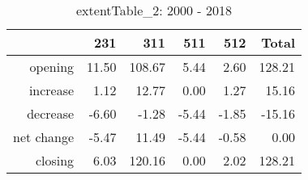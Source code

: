 \begin{table}[ht]
\centering
\begin{tabular}{rrrrrr}
  \hline
 & 231 & 311 & 511 & 512 & Total \\ 
  \hline
opening & 11.50 & 108.67 & 5.44 & 2.60 & 128.21 \\ 
  increase & 1.12 & 12.77 & 0.00 & 1.27 & 15.16 \\ 
  decrease & -6.60 & -1.28 & -5.44 & -1.85 & -15.16 \\ 
  net change & -5.47 & 11.49 & -5.44 & -0.58 & 0.00 \\ 
  closing & 6.03 & 120.16 & 0.00 & 2.02 & 128.21 \\ 
   \hline
\end{tabular}
\caption{extentTable\_2: 2000 - 2018} 
\end{table}
